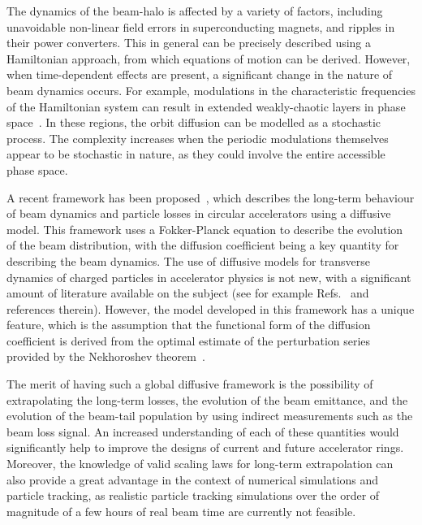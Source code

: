 The dynamics of the beam-halo is affected by a variety of factors, including unavoidable non-linear field errors in superconducting magnets, and ripples in their power converters. This in general can be precisely described using a Hamiltonian approach, from which equations of motion can be derived. However, when time-dependent effects are present, a significant change in the nature of beam dynamics occurs. For example, modulations in the characteristic frequencies of the Hamiltonian system can result in extended weakly-chaotic layers in phase space~\cite{NEISHTADT1991}. In these regions, the orbit diffusion can be modelled as a stochastic process. The complexity increases when the periodic modulations themselves appear to be stochastic in nature, as they could involve the entire accessible phase space.

A recent framework has been proposed~\cite{Bazzani:2019lse,bazzani2020diffusion}, which describes the long-term behaviour of beam dynamics and particle losses in circular accelerators using a diffusive model. This framework uses a Fokker-Planck equation to describe the evolution of the beam distribution, with the diffusion coefficient being a key quantity for describing the beam dynamics. The use of diffusive models for transverse dynamics of charged particles in accelerator physics is not new, with a significant amount of literature available on the subject (see for example Refs.~{\cite{Burnod:205343,Meddahi:223301,PhysRevLett.68.33,gerasimov1992applicability,MESS1994279,zimmermann1994transverse,PhysRevLett.77.1051,PhysRevSTAB.5.074001,flilleriii:pac03-rpag004,stancari2011diffusion,stancari:ipac11-tupz033,PhysRevSTAB.15.101001,Stancari:1637929}} and references therein). However, the model developed in this framework has a unique feature, which is the assumption that the functional form of the diffusion coefficient is derived from the optimal estimate of the perturbation series provided by the Nekhoroshev theorem~\cite{Nekhoroshev:1977aa,Bazzani:1990aa,Turchetti:1990aa}.

The merit of having such a global diffusive framework is the possibility of extrapolating the long-term losses, the evolution of the beam emittance, and the evolution of the beam-tail population by using indirect measurements such as the beam loss signal. An increased understanding of each of these quantities would significantly help to improve the designs of current and future accelerator rings. Moreover, the knowledge of valid scaling laws for long-term extrapolation can also provide a great advantage in the context of numerical simulations and particle tracking, as realistic particle tracking simulations over the order of magnitude of a few hours of real beam time are currently not feasible.

